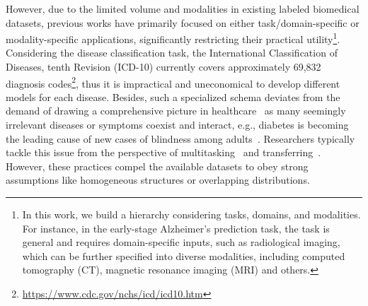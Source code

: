 \documentclass[10pt]{article} \usepackage[preprint]{tmlr}
\begin{document}
However, due to the limited volume and modalities in existing labeled biomedical datasets, previous works have primarily focused on either task/domain-specific or modality-specific applications, significantly restricting their practical utility\footnote{In this work, we build a hierarchy considering tasks, domains, and modalities. For instance, in the early-stage Alzheimer's prediction task, the task is general and requires domain-specific inputs, such as radiological imaging, which can be further specified into diverse modalities, including computed tomography (CT), magnetic resonance imaging (MRI) and others.}. Considering the disease classification task, the International Classification of Diseases, tenth Revision (ICD-10) currently covers approximately 69,832 diagnosis codes\footnote{\url{https://www.cdc.gov/nchs/icd/icd10.htm}}, thus it is impractical and uneconomical to develop different models for each disease. Besides, such a specialized schema deviates from the demand of drawing a comprehensive picture in healthcare~\citep{lindberg1993unified} as many seemingly irrelevant diseases or symptoms coexist and interact, e.g., diabetes is becoming the leading cause of new cases of blindness among adults~\citep{fong2004retinopathy}. Researchers typically tackle this issue from the perspective of multitasking~\citep{peng2020empirical} and transferring~\citep{raghu2019transfusion}. However, these practices compel the available datasets to obey strong assumptions like homogeneous structures or overlapping distributions. 
\end{document}
